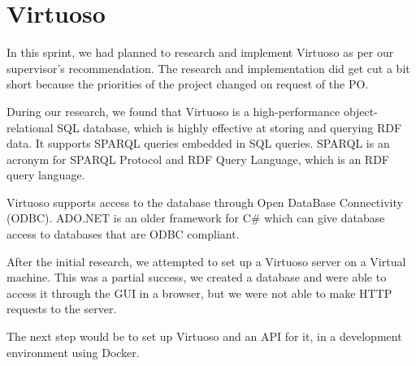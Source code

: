 \section{Virtuoso}
In this sprint, we had planned to research and implement Virtuoso as per our supervisor's recommendation.
The research and implementation did get cut a bit short because the priorities of the \knox{} project changed on request of the PO.

During our research, we found that Virtuoso is a high-performance object-relational SQL database, which is highly effective at storing and querying RDF data. It supports SPARQL queries embedded in SQL queries. SPARQL is an acronym for SPARQL Protocol and RDF Query Language, which is an RDF query language.


Virtuoso supports access to the database through Open DataBase Connectivity (ODBC).
ADO.NET is an older framework for C\# which can give database access to databases that are ODBC compliant.


After the initial research, we attempted to set up a Virtuoso server on a Virtual machine. This was a partial success, we created a database and were able to access it through the GUI in a browser, but we were not able to make HTTP requests to the server.

The next step would be to set up Virtuoso and an API for it, in a development environment using Docker.
